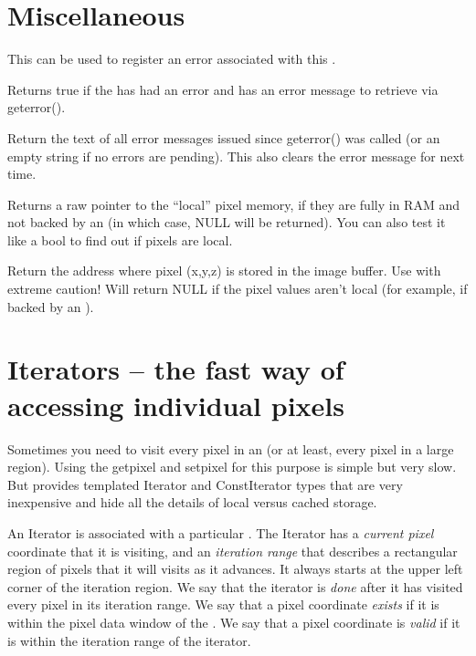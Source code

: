 \section{Miscellaneous}

This can be used to register an error associated with this \ImageBuf.
\apiend

Returns {\cf true} if the \ImageBuf has had an error and has an error
message to retrieve via {\cf geterror()}.
\apiend

Return the text of all error messages issued since {\cf geterror()} was
called (or an empty string if no errors are pending).  This also
clears the error message for next time.
\apiend

Returns a raw pointer to the ``local'' pixel memory, if they are fully
in RAM and not backed by an \ImageCache (in which case, {\cf NULL} will
be returned).  You can also test it like a {\cf bool} to find out if
pixels are local.
\apiend

Return the address where pixel (x,y,z) is stored in the image buffer.
Use with extreme caution!  Will return NULL if the pixel values
aren't local (for example, if backed by an \ImageCache).
\apiend



\section{Iterators -- the fast way of accessing individual pixels}

Sometimes you need to visit every pixel in an \ImageBuf (or at least,
every pixel in a large region).  Using the {\cf getpixel} and {\cf
  setpixel} for this purpose is simple but very slow.  But \ImageBuf
provides templated {\cf Iterator} and {\cf ConstIterator} types
that are very inexpensive and hide all the details of local versus
cached storage.

An {\cf Iterator} is associated with a particular \ImageBuf.  
The {\cf Iterator} has a \emph{current pixel} coordinate that it is
visiting, and an \emph{iteration range} that describes a rectangular
region of pixels that it will visits as it advances.  It always starts
at the upper left corner of the iteration region.  We say that
the iterator is \emph{done} after it has visited every pixel in its
iteration range.  We say that a pixel coordinate \emph{exists} if it is
within the pixel data window of the \ImageBuf.  We say that a pixel
coordinate is \emph{valid} if it is within the iteration range of the
iterator.

